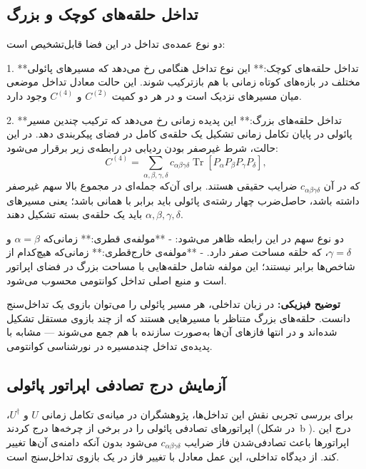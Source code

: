 \subsection{تداخل حلقه‌های کوچک و بزرگ}

دو نوع عمده‌ی تداخل در این فضا قابل‌تشخیص است:

1. **تداخل حلقه‌های کوچک:**
این نوع تداخل هنگامی رخ می‌دهد که مسیرهای پائولی مختلف در بازه‌های کوتاه زمانی با هم بازترکیب شوند. این حالت معادل تداخل موضعی میان مسیرهای نزدیک است و در هر دو کمیت \(C^{(2)}\) و \(C^{(4)}\) وجود دارد.

2. **تداخل حلقه‌های بزرگ:**
این پدیده زمانی رخ می‌دهد که ترکیب چندین مسیر پائولی در پایان تکامل زمانی تشکیل یک حلقه‌ی کامل در فضای پیکربندی دهد. در این حالت، شرط غیرصفر بودن ردیابی در رابطه‌ی زیر برقرار می‌شود:
\[
C^{(4)} = \sum_{\alpha, \beta, \gamma, \delta} c_{\alpha\beta\gamma\delta}
\operatorname{Tr}\!\left[P_\alpha P_\beta P_\gamma P_\delta\right],
\tag{2}
\]
که در آن \(c_{\alpha\beta\gamma\delta}\) ضرایب حقیقی هستند.  
برای آن‌که جمله‌ای در مجموع بالا سهم غیرصفر داشته باشد، حاصل‌ضرب چهار رشته‌ی پائولی باید برابر با همانی باشد؛ یعنی مسیرهای \(\alpha, \beta, \gamma, \delta\) باید یک حلقه‌ی بسته تشکیل دهند.

دو نوع سهم در این رابطه ظاهر می‌شود:
- **مولفه‌ی قطری:** زمانی‌که \(\alpha=\beta\) و \(\gamma=\delta\)، که حلقه مساحت صفر دارد.  
- **مولفه‌ی خارج‌قطری:** زمانی‌که هیچ‌کدام از شاخص‌ها برابر نیستند؛ این مولفه شامل حلقه‌هایی با مساحت بزرگ در فضای اپراتور است و منبع اصلی تداخل کوانتومی محسوب می‌شود.

\textbf{توضیح فیزیکی:}  
در زبان تداخلی، هر مسیر پائولی را می‌توان بازوی یک تداخل‌سنج دانست. حلقه‌های بزرگ متناظر با مسیرهایی هستند که از چند بازوی مستقل تشکیل شده‌اند و در انتها فازهای آن‌ها به‌صورت سازنده با هم جمع می‌شوند — مشابه با پدیده‌ی تداخل چندمسیره در نورشناسی کوانتومی.
\subsection{آزمایش درج تصادفی اپراتور پائولی}

برای بررسی تجربی نقش این تداخل‌ها، پژوهشگران در میانه‌ی تکامل زمانی \(U\) و \(U^\dagger\)، اپراتورهای تصادفی پائولی را در برخی از چرخه‌ها درج کردند (در شکل~b \lr{\ref{fig3}}).  
درج این اپراتورها باعث تصادفی‌شدن فاز ضرایب \(c_{\alpha\beta\gamma\delta}\) می‌شود بدون آنکه دامنه‌ی آن‌ها تغییر کند.  
از دیدگاه تداخلی، این عمل معادل با تغییر فاز در یک بازوی تداخل‌سنج است.

